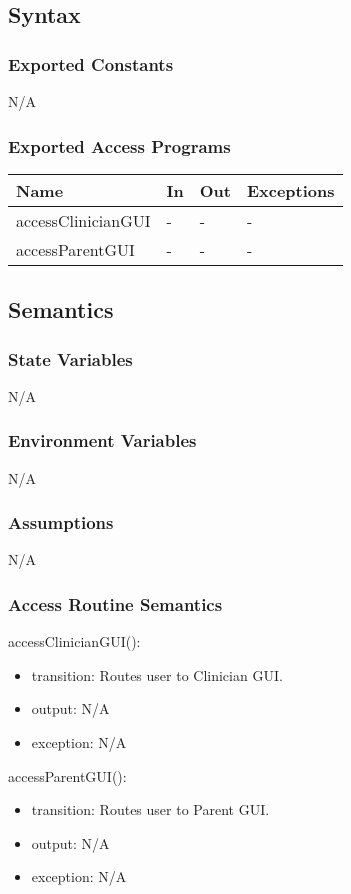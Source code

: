 \documentclass[12pt, titlepage]{article}
\begin{document}
\subsection{Syntax}

\subsubsection{Exported Constants}

N/A

\subsubsection{Exported Access Programs}

\begin{center}
\begin{tabular}{p{8cm} p{4cm} p{2cm} p{2cm}}
\hline
\textbf{Name} & \textbf{In} & \textbf{Out} & \textbf{Exceptions} \\
\hline
accessClinicianGUI & - & - & - \\
accessParentGUI & - & - & - \\
\hline
\end{tabular}
\end{center}

\subsection{Semantics}

\subsubsection{State Variables}
N/A

\subsubsection{Environment Variables}
N/A

\subsubsection{Assumptions}
N/A

\subsubsection{Access Routine Semantics}

\noindent accessClinicianGUI():
\begin{itemize}
\item transition: Routes user to Clinician GUI.
\item output: N/A
\item exception: N/A
\end{itemize}
\noindent accessParentGUI():
\begin{itemize}
\item transition: Routes user to Parent GUI.
\item output: N/A
\item exception: N/A
\end{itemize}
\end{document}

